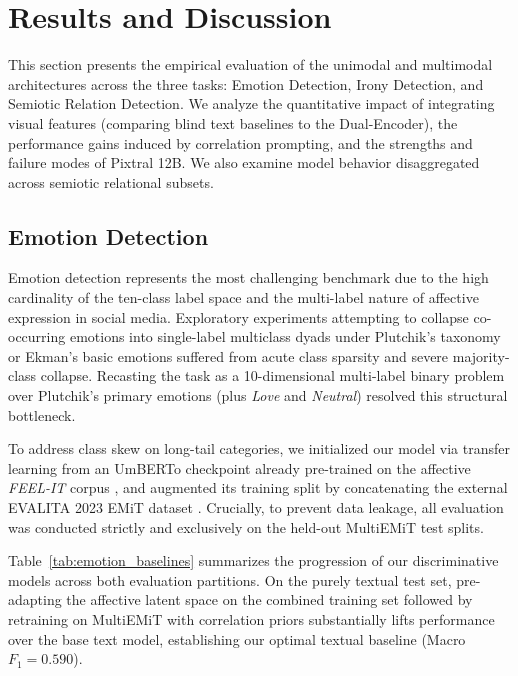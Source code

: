 \section{Results and Discussion}
\label{sec:results}

This section presents the empirical evaluation of the unimodal and multimodal architectures across the three tasks: Emotion Detection, Irony Detection, and Semiotic Relation Detection. We analyze the quantitative impact of integrating visual features (comparing blind text baselines to the Dual-Encoder), the performance gains induced by correlation prompting, and the strengths and failure modes of Pixtral 12B. We also examine model behavior disaggregated across semiotic relational subsets.

\subsection{Emotion Detection}
\label{sec:emotion_results}

Emotion detection represents the most challenging benchmark due to the high cardinality of the ten-class label space and the multi-label nature of affective expression in social media. Exploratory experiments attempting to collapse co-occurring emotions into single-label multiclass dyads under Plutchik's taxonomy or Ekman's basic emotions suffered from acute class sparsity and severe majority-class collapse. Recasting the task as a 10-dimensional multi-label binary problem over Plutchik's primary emotions (plus \textit{Love} and \textit{Neutral}) resolved this structural bottleneck.

To address class skew on long-tail categories, we initialized our model via transfer learning from an UmBERTo checkpoint already pre-trained on the affective \textit{FEEL-IT} corpus \cite{bianchi2021feel}, and augmented its training split by concatenating the external EVALITA 2023 EMiT dataset \cite{emit}. Crucially, to prevent data leakage, all evaluation was conducted strictly and exclusively on the held-out MultiEMiT test splits.

Table~\ref{tab:emotion_baselines} summarizes the progression of our discriminative models across both evaluation partitions. On the purely textual test set, pre-adapting the affective latent space on the combined training set followed by retraining on MultiEMiT with correlation priors substantially lifts performance over the base text model, establishing our optimal textual baseline (Macro $F_1 = 0.590$).

